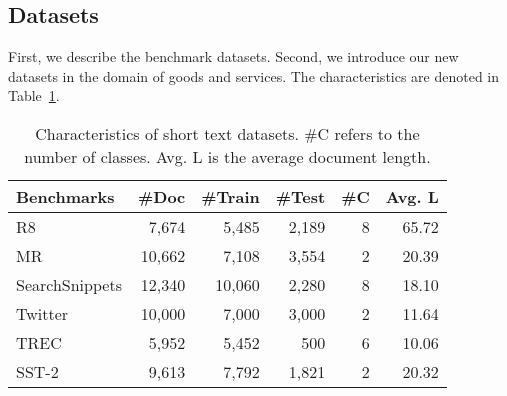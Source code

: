 \documentclass[runningheads]{llncs}
\begin{document}
\subsection{Datasets}
First, we describe the benchmark datasets. Second, we introduce our new datasets in the domain of goods and services. 
The characteristics are denoted in Table~\ref{tab:datasets}.
    \begin{table}[ht]
       \small
        \centering
        \caption{Characteristics of short text datasets. 
        \#C refers to the number of classes.
        Avg. L is the average document length.
        }\label{tab:datasets}
        \begin{tabular}{l|rrrrr}

\toprule
            \textbf{Benchmarks}          & \textbf{\#Doc} & \textbf{\#Train} & \textbf{\#Test} & \textbf{\#C} & \textbf{Avg. L} \\
            \midrule
            R8                                   & 7,674          & 5,485            & 2,189           & 8                  & 65.72                \\
            MR                                   & 10,662         & 7,108            & 3,554           & 2                  & 20.39                \\
            SearchSnippets                       & 12,340         & 10,060           & 2,280           & 8                  & 18.10                \\
            Twitter                              & 10,000         & 7,000            & 3,000           & 2                  & 11.64                \\
            TREC                                 & 5,952          & 5,452            & 500             & 6                  & 10.06                \\
            SST-2                                & 9,613          & 7,792            & 1,821           & 2                  & 20.32                \\


\end{tabular}
\end{table}
\end{document}

